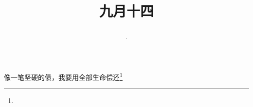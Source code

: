 \title{\date[d=16,m=10,y=2024][year:cn-y,年,month:cn,day:cn,日,·,weekday]·九月十四 }
像一笔坚硬的债，我要用全部生命偿还\footnote{ }

